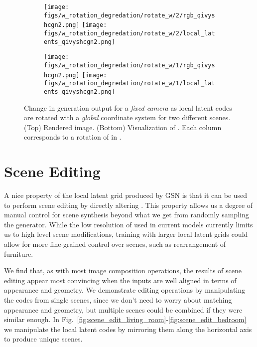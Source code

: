 \documentclass[10pt,twocolumn,letterpaper]{article}
\begin{document}
\begin{figure*}[h]
	\centering
	\begin{subfigure}{0.49\linewidth}
		\centering
		\texttt{[image: figs/w\_rotation\_degredation/rotate\_w/2/rgb\_qivyshcgn2.png]}
		\texttt{[image: figs/w\_rotation\_degredation/rotate\_w/2/local\_latents\_qivyshcgn2.png]}
	\end{subfigure} \hfill
	\begin{subfigure}{0.49\linewidth}
		\centering
		\texttt{[image: figs/w\_rotation\_degredation/rotate\_w/1/rgb\_qivyshcgn2.png]}
		\texttt{[image: figs/w\_rotation\_degredation/rotate\_w/1/local\_latents\_qivyshcgn2.png]}
	\end{subfigure}
	\caption{Change in generation output for a \textit{fixed camera} as local latent codes are rotated with a \textit{global} coordinate system for two different scenes. (Top) Rendered image. (Bottom) Visualization of . Each column corresponds to a rotation of  in .}
	\label{fig:rotate_W_global}
\end{figure*}

\section{Scene Editing} 

A nice property of the local latent grid produced by GSN is that it can be used to perform scene editing by directly altering . This property allows us a degree of manual control for scene synthesis beyond what we get from randomly sampling the generator. While the low resolution of  used in current models currently limits us to high level scene modifications, training with larger local latent grids could allow for more fine-grained control over scenes, such as rearrangement of furniture. 

We find that, as with most image composition operations, the results of scene editing appear most convincing when the inputs are well aligned in terms of appearance and geometry. We demonstrate editing operations by manipulating the codes from single scenes, since we don't need to worry about matching appearance and geometry, but multiple scenes could be combined if they were similar enough.
In Fig.~\ref{fig:scene_edit_living_room}-\ref{fig:scene_edit_bedroom} we manipulate the local latent codes by mirroring them along the horizontal axis to produce unique scenes.
\end{document}
